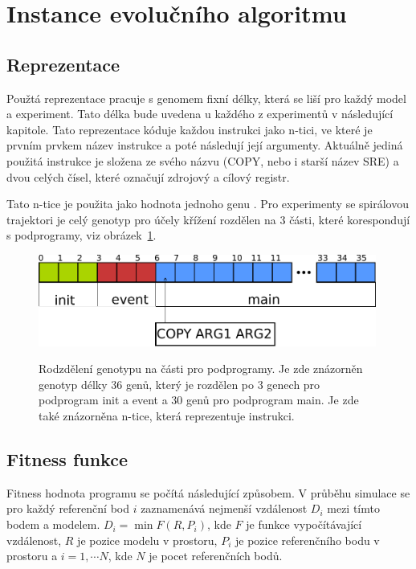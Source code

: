 \section{Instance evolučního algoritmu}

\subsection{Reprezentace}
Použtá reprezentace pracuje s genomem fixní délky, která se liší pro každý model a experiment.
Tato délka bude uvedena u každého z experimentů v následující kapitole.
Tato reprezentace kóduje každou instrukci jako n-tici, ve které je prvním prvkem název instrukce a poté následují její argumenty.
Aktuálně jediná použitá instrukce je složena ze svého názvu (COPY, nebo i starší název SRE) a dvou celých čísel, které označují zdrojový a cílový registr.

Tato n-tice je použita jako hodnota jednoho genu .
Pro experimenty se spirálovou trajektori je celý genotyp pro účely křížení rozdělen na 3 části, které korespondují s podprogramy, viz obrázek~\ref{fig:genotyp}.

\begin{figure}[h]
    \centering
    {\includegraphics[width=30em]{obrazky/genotyp.pdf}}
    \caption{
    Rodzdělení genotypu na části pro podprogramy.
    Je zde znázorněn genotyp délky 36 genů, který je rozdělen po 3 genech pro podprogram init a event a 30 genů pro podprogram main.
    Je zde také znázorněna n-tice, která reprezentuje instrukci.
    }
    \label{fig:genotyp}
\end{figure}


\subsection{Fitness funkce}
Fitness hodnota programu se počítá následující způsobem.
V průběhu simulace se pro každý referenční bod $i$ zaznamenává nejmenší vzdálenost $D_i$ mezi tímto bodem a modelem.
$D_i = \min{F(R, P_i)}$, kde $F$ je funkce vypočítávající vzdálenost, $R$ je pozice modelu v prostoru, $P_i$ je pozice referenčního bodu v prostoru a $i=1, \cdots N$, kde $N$ je pocet referenčních bodů.

